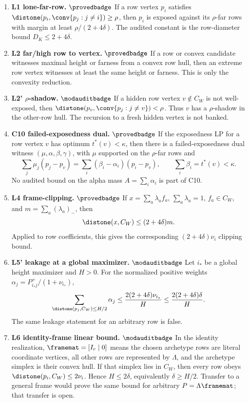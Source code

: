 \begin{enumerate}[leftmargin=*,itemsep=0.5ex]
\item \textbf{L1 lone-far-row.} \(\provedbadge\)
If a row vertex \(p_i\) satisfies
\(\distone(p_i,\conv\{p_j:j\ne i\})\ge\rho\), then \(p_i\) is exposed
against its \(\rho\)-far rows with margin at least
\(\rho/(2+4\delta)\).  The audited constant is the row-diameter bound
\(D_K\le 2+4\delta\).

\item \textbf{L2 far/high row to vertex.} \(\provedbadge\)
If a row or convex candidate witnesses maximal height or farness from a
convex row hull, then an extreme row vertex witnesses at least the same
height or farness.  This is only the convexity reduction.

\item \textbf{L2' \(\rho\)-shadow.} \(\modauditbadge\)
If a hidden row vertex \(v\notin C_W\) is not well-exposed, then
\(\distone(p_v,\conv\{p_j:j\ne v\})<\rho\).  Thus \(v\) has a
\(\rho\)-shadow in the other-row hull.  The recursion to a fresh hidden
vertex is not banked.

\item \textbf{C10 failed-exposedness dual.} \(\provedbadge\)
If the exposedness LP for a row vertex \(v\) has optimum
\(t^*(v)<\kappa\), then there is a failed-exposedness dual witness
\((\mu,\alpha,\beta,\gamma)\), with \(\mu\) supported on the
\(\rho\)-far rows and
\[
 \sum_j\mu_j(p_j-p_v)=\sum_i(\beta_i-\alpha_i)(p_i-p_v),
        \qquad \sum_i\beta_i=t^*(v)<\kappa .
\]
No audited bound on the alpha mass \(A=\sum_i\alpha_i\) is part of C10.

\item \textbf{L4 frame-clipping.} \(\provedbadge\)
If \(x=\sum_a\lambda_a f_a\), \(\sum_a\lambda_a=1\),
\(f_a\in C_W\), and \(m=\sum_a(\lambda_a)_-\), then
\[
        \distone(x,C_W)\le (2+4\delta)m .
\]
Applied to row coefficients, this gives the corresponding
\((2+4\delta)\nu_i\) clipping bound.

\item \textbf{L5' leakage at a global maximizer.} \(\modauditbadge\)
Let \(i_*\) be a global height maximizer and \(H>0\).  For the normalized
positive weights \(\alpha_j=P_{i_*j}^+/(1+\nu_{i_*})\),
\[
 \sum_{\distone(p_j,C_W)\le H/2}\alpha_j
       \le \frac{2(2+4\delta)\nu_{i_*}}{H}
       \le \frac{2(2+4\delta)\delta}{H}.
\]
The same leakage statement for an arbitrary row is false.

\item \textbf{L6 identity-frame linear bound.} \(\modauditbadge\)
In the identity realization, \(\framemat=[I_r\mid0]\) means the chosen
archetype rows are literal coordinate vertices, all other rows are represented
by \(\Lambda\), and the archetype simplex is their convex hull.  If that
simplex lies in \(C_W\), then every row obeys
\(\distone(p_i,C_W)\le 2\nu_i\).  Hence \(H\le 2\delta\), equivalently
\(\delta\ge H/2\).  Transfer to a general frame would prove the same
bound for arbitrary \(P=\Lambda\framemat\); that transfer is open.


\end{enumerate}
